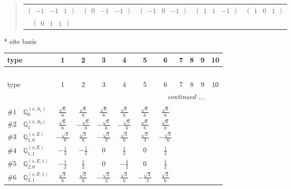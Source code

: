 \documentclass[fleqn,9pt,landscape]{jsarticle}
\begin{document}
\begin{quote}
\begin{tabular}{ccccc}
$ \begin{pmatrix} -1 & -1 & 1 \end{pmatrix} $ & $ \begin{pmatrix} 0 & -1 & -1 \end{pmatrix} $ & $ \begin{pmatrix} -1 & 0 & -1 \end{pmatrix} $ & $ \begin{pmatrix} 1 & 1 & -1 \end{pmatrix} $ & $ \begin{pmatrix} 1 & 0 & 1 \end{pmatrix} $ \\
$ \begin{pmatrix} 0 & 1 & 1 \end{pmatrix} $ & $  $ & $  $ & $  $ & $  $
\end{tabular}
\end{quote}
* site basis
\begin{center}
\renewcommand{\arraystretch}{1.3}
\begin{longtable}{lcccccccccc}
 \hline \hline
type & 1 & 2 & 3 & 4 & 5 & 6 & 7 & 8 & 9 & 10 \\ \hline \endfirsthead

\multicolumn{10}{l}{\tablename\ \thetable{}} \\
 \hline \hline
type & 1 & 2 & 3 & 4 & 5 & 6 & 7 & 8 & 9 & 10 \\ \hline \endhead

 \hline \hline
\multicolumn{10}{r}{\footnotesize\it continued ...} \\ \endfoot

 \hline \hline
\multicolumn{10}{r}{} \\ \endlastfoot

$ \#1\quad \mathbb{Q}_{0}^{(s,A_{1})} $ & $ \frac{\sqrt{6}}{6} $ & $ \frac{\sqrt{6}}{6} $ & $ \frac{\sqrt{6}}{6} $ & $ \frac{\sqrt{6}}{6} $ & $ \frac{\sqrt{6}}{6} $ & $ \frac{\sqrt{6}}{6} $ \\ \hline
$ \#2\quad \mathbb{Q}_{1}^{(s,A_{2})} $ & $ \frac{\sqrt{6}}{6} $ & $ - \frac{\sqrt{6}}{6} $ & $ - \frac{\sqrt{6}}{6} $ & $ - \frac{\sqrt{6}}{6} $ & $ \frac{\sqrt{6}}{6} $ & $ \frac{\sqrt{6}}{6} $ \\ \hline
$ \#3\quad \mathbb{Q}_{1,0}^{(s,E)} $ & $ - \frac{\sqrt{3}}{6} $ & $ \frac{\sqrt{3}}{6} $ & $ - \frac{\sqrt{3}}{3} $ & $ \frac{\sqrt{3}}{6} $ & $ \frac{\sqrt{3}}{3} $ & $ - \frac{\sqrt{3}}{6} $ \\ \hline
$ \#4\quad \mathbb{Q}_{1,1}^{(s,E)} $ & $ - \frac{1}{2} $ & $ - \frac{1}{2} $ & $ 0 $ & $ \frac{1}{2} $ & $ 0 $ & $ \frac{1}{2} $ \\ \hline
$ \#5\quad \mathbb{Q}_{2,0}^{(s,E,1)} $ & $ - \frac{1}{2} $ & $ \frac{1}{2} $ & $ 0 $ & $ - \frac{1}{2} $ & $ 0 $ & $ \frac{1}{2} $ \\ \hline
$ \#6\quad \mathbb{Q}_{2,1}^{(s,E,1)} $ & $ \frac{\sqrt{3}}{6} $ & $ \frac{\sqrt{3}}{6} $ & $ - \frac{\sqrt{3}}{3} $ & $ \frac{\sqrt{3}}{6} $ & $ - \frac{\sqrt{3}}{3} $ & $ \frac{\sqrt{3}}{6} $ \\
\end{longtable}
\end{center}
\end{document}
